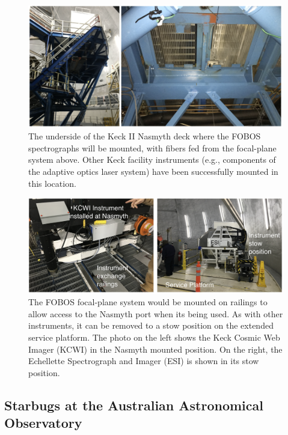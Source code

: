 \documentclass[oneside,11pt]{amsart}
\begin{document}
\begin{figure}[h!]
%
\vskip -0.1in
%
\includegraphics[width=\textwidth]{figs/nasmyth_deck.png}
%
\caption{\small The underside of the Keck II Nasmyth deck where the
FOBOS spectrographs will be mounted, with fibers fed from the
focal-plane system above.  Other Keck facility instruments (e.g.,
components of the adaptive optics laser system) have been successfully
mounted in this location.}
%
\label{fig:nasmyth_mount}
%
\end{figure}


\begin{figure}[h!]
%
\vskip -0.1in
%
\includegraphics[width=\textwidth]{figs/Keck_instrument_exchange.png}
%
\caption{\small The FOBOS focal-plane system would be mounted on
railings to allow access to the Nasmyth port when its being used.  As
with other instruments, it can be removed to a stow position on the
extended service platform.  The photo on the left shows the Keck Cosmic
Web Imager (KCWI) in the Nasmyth mounted position.  On the right, the
Echellette Spectrograph and Imager (ESI) is shown in its stow position.}
%
\label{fig:keck_exchange}
%
\end{figure}

\subsection{Starbugs at the Australian Astronomical Observatory}
\label{sec:AAO}
\end{document}

